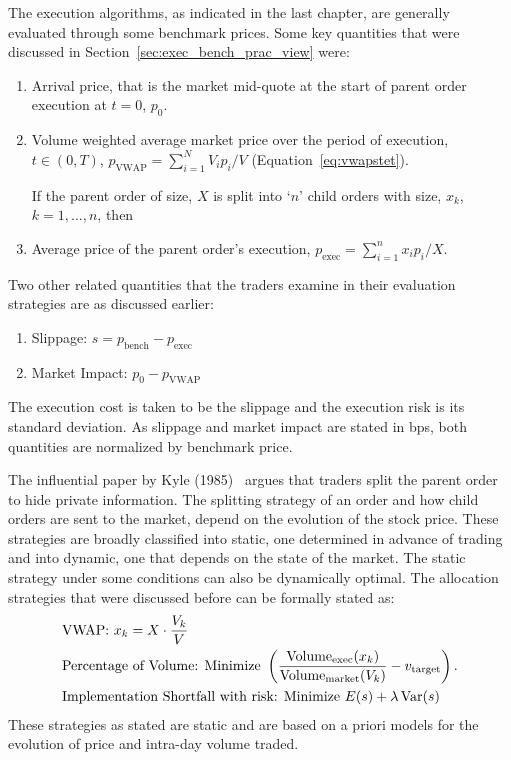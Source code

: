 The execution algorithms, as indicated in the last chapter, are generally evaluated through some benchmark prices. Some key quantities that were discussed in Section~\ref{sec:exec_bench_prac_view} were:
	\begin{enumerate}[--]
	\item Arrival price, that is the market mid-quote at the start of parent order execution at $t= 0$, $p_0$.
	\item Volume weighted average market price over the period of execution, $t \in (0,T)$, $p_{\text{VWAP}}= \sum_{i=1}^N V_ip_i/V$ (Equation~\ref{eq:vwapstet}). \twomedskip
	
	If the parent order of size, $X$ is split into `$n$' child orders with size, $x_k$, $k=1,\ldots,n$, then
	\item Average price of the parent order's execution, $p_{\text{exec}}= \sum_{i=1}^n x_ip_i/X$. 
	\end{enumerate}
	
Two other related quantities that the traders examine in their evaluation strategies are as discussed earlier:
	\begin{enumerate}[--]
	\item Slippage: $s= p_{\text{bench}} - p_{\text{exec}}$
	\item Market Impact: $p_0 - p_{\text{VWAP}}$
	\end{enumerate}
The execution cost is taken to be the slippage and the execution risk is its standard deviation. As slippage and market impact are stated in bps, both quantities are normalized by benchmark price. 


The influential paper by Kyle (1985)~\cite{kyle1985} argues that traders split the parent order to hide private information. The splitting strategy of an order and how child orders are sent to the market, depend on the evolution of the stock price. These strategies are broadly classified into static, one determined in advance of trading and into dynamic, one that depends on the state of the market. The static strategy under some conditions can also be dynamically optimal. The allocation strategies that were discussed before can be formally stated as:
	\[
	\begin{split}
	&\text{VWAP: } x_k= X \cdot \dfrac{V_k}{V} \\
	&\text{Percentage of Volume: Minimize } \left( \dfrac{\text{Volume}_{\text{exec}}(x_k)}{\text{Volume}_{\text{market}}(V_k)} - v_{\text{target}} \right). \\
	&\text{Implementation Shortfall with risk: Minimize } E(s) + \lambda \operatorname{Var}(s)
	\end{split}
	\]
These strategies as stated are static and are based on a priori models for the evolution of price and intra-day volume traded. 


